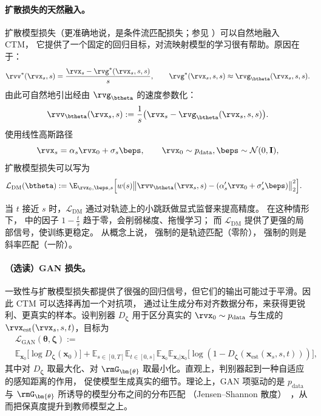 \paragraph{扩散损失的天然融入。}
扩散模型损失（更准确地说，是条件流匹配损失；参见 ）可以自然地融入 CTM，
它提供了一个固定的回归目标，对流映射模型的学习很有帮助。原因在于：
\[
\rvv^*(\rvx_s, s)
= \frac{\rvx_s - \rvg^*(\rvx_s, s, s)}{s},
\qquad
\rvg^*(\rvx_s, s, s) \approx \rvg_{\btheta}(\rvx_s, s, s).
\]
由此可自然地引出经由 $\rvg_{\btheta}$ 的速度参数化：
\[
\rvv_{\btheta}(\rvx_s, s)
:= \frac{1}{s}\bigl(\rvx_s - \rvg_{\btheta}(\rvx_s, s, s)\bigr).
\]
使用线性高斯路径
\[
\rvx_s = \alpha_s \rvx_0 + \sigma_s \beps,
\qquad
\rvx_0 \sim p_{\mathrm{data}},
\beps \sim \mathcal N(0, \mathbf I),
\]
扩散模型损失可以写为
\begin{align}\label{eq:ctm-dsm}
\mathcal L_{\mathrm{DM}}(\btheta)
&:=
\E_{\rvx_0, \beps, s}
\Bigl[
w(s)
\bigl\|
 \rvv_{\btheta}(\rvx_s, s) - \left(\alpha_s' \rvx_0 + \sigma_s' \beps\right)
\bigr\|_2^2
\Bigr].
\end{align}


当 $t$ 接近 $s$ 时，$\mathcal L_{\mathrm{DM}}$ 通过对轨迹上的小跳跃做显式监督来提高精度。
在这种情形下， 中的因子 $1-\tfrac{t}{s}$ 趋于零，会削弱梯度、拖慢学习；
而 $\mathcal L_{\mathrm{DM}}$ 提供了更强的局部信号，使训练更稳定。
从概念上说， 强制的是轨迹匹配（零阶），
 强制的则是斜率匹配（一阶）。

\paragraph{（选读）GAN 损失。}
一致性与扩散模型损失都提供了很强的回归信号，但它们的输出可能过于平滑。因此 CTM 可以选择再加一个对抗项，
通过让生成分布对齐数据分布，来获得更锐利、更真实的样本。设判别器
$D_{\bm{\zeta}}$ 用于区分真实的 $\rvx_{0}\sim p_{\mathrm{data}}$ 与生成的 $\rvx_{\mathrm{est}}(\rvx_{s},s,t)$，目标为
\begin{align*}
&\mathcal{L}_{\mathrm{GAN}}(\bm{\theta}, \bm{\zeta}) := \\ &\mathbb{E}_{\mathbf{x}_0} \big[\log D_{\bm{\zeta}}(\mathbf{x}_0)\big] + \mathbb{E}_{s \in [0, T]} \mathbb{E}_{t \in [0, s]} \mathbb{E}_{\mathbf{x}_0} \mathbb{E}_{\mathbf{x}_s \vert \mathbf{x}_0} \big[\log (1 - D_{\bm{\zeta}}( \mathbf{x}_{\mathrm{est}}(\mathbf{x}_s, s, t)))\big], \end{align*}
其中对 $D_{\bm{\zeta}}$ 取最大化、对 $\rmG_{\bm{\theta}}$ 取最小化。直观上，判别器起到一种自适应的感知距离的作用，
促使模型生成真实的细节。理论上，GAN 项驱动的是 $p_{\mathrm{data}}$ 与 $\rmG_{\bm{\theta}}$ 所诱导的模型分布之间的分布匹配
（Jensen--Shannon 散度）~\citep{goodfellow2014generative}，从而把保真度提升到教师模型之上。

